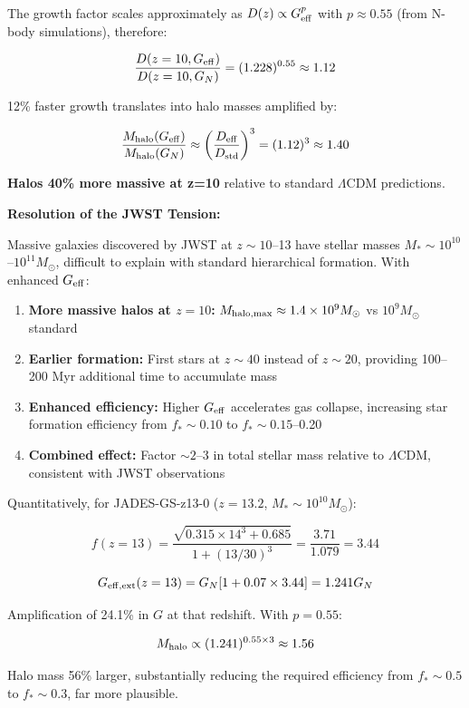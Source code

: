 \documentclass[11pt,a4paper]{article}
\providecommand{\tightlist}{\setlength{\itemsep}{0pt}\setlength{\parskip}{0pt}}
\begin{document}
The growth factor scales approximately as \(D(z) \propto G_{\rm eff}^p\)
with \(p \approx 0.55\) (from N-body simulations), therefore:

\[\frac{D(z=10, G_{\rm eff})}{D(z=10, G_N)} = (1.228)^{0.55} \approx 1.12\]

12\% faster growth translates into halo masses amplified by:

\[\frac{M_{\rm halo}(G_{\rm eff})}{M_{\rm halo}(G_N)} \approx \left(\frac{D_{\rm eff}}{D_{\rm std}}\right)^3 = (1.12)^3 \approx 1.40\]

\textbf{Halos 40\% more massive at z=10} relative to standard
\(\Lambda\)CDM predictions.

\textbf{Resolution of the JWST Tension:}

Massive galaxies discovered by JWST at \(z \sim 10\)--13 have stellar
masses \(M_* \sim 10^{10}\)--\(10^{11} M_\odot\), difficult to explain
with standard hierarchical formation. With enhanced \(G_{\rm eff}\):

\begin{enumerate}
\def\labelenumi{\arabic{enumi}.}
\tightlist
\item
  \textbf{More massive halos at \(z=10\):}
  \(M_{\rm halo,max} \approx 1.4 \times 10^9 M_\odot\) vs
  \(10^9 M_\odot\) standard
\item
  \textbf{Earlier formation:} First stars at \(z \sim 40\) instead of
  \(z \sim 20\), providing 100--200 Myr additional time to accumulate
  mass
\item
  \textbf{Enhanced efficiency:} Higher \(G_{\rm eff}\) accelerates gas
  collapse, increasing star formation efficiency from \(f_* \sim 0.10\)
  to \(f_* \sim 0.15\)--0.20
\item
  \textbf{Combined effect:} Factor \(\sim 2\)--3 in total stellar mass
  relative to \(\Lambda\)CDM, consistent with JWST observations
\end{enumerate}

Quantitatively, for JADES-GS-z13-0 (\(z=13.2\),
\(M_* \sim 10^{10} M_\odot\)):

\[f(z=13) = \frac{\sqrt{0.315 \times 14^3 + 0.685}}{1+(13/30)^3} = \frac{3.71}{1.079} = 3.44\]

\[G_{\rm eff,ext}(z=13) = G_N[1 + 0.07 \times 3.44] = 1.241 G_N\]

Amplification of 24.1\% in \(G\) at that redshift. With \(p = 0.55\):

\[M_{\rm halo} \propto (1.241)^{0.55 \times 3} \approx 1.56\]

Halo mass 56\% larger, substantially reducing the required efficiency
from \(f_* \sim 0.5\) to \(f_* \sim 0.3\), far more plausible.
\end{document}
